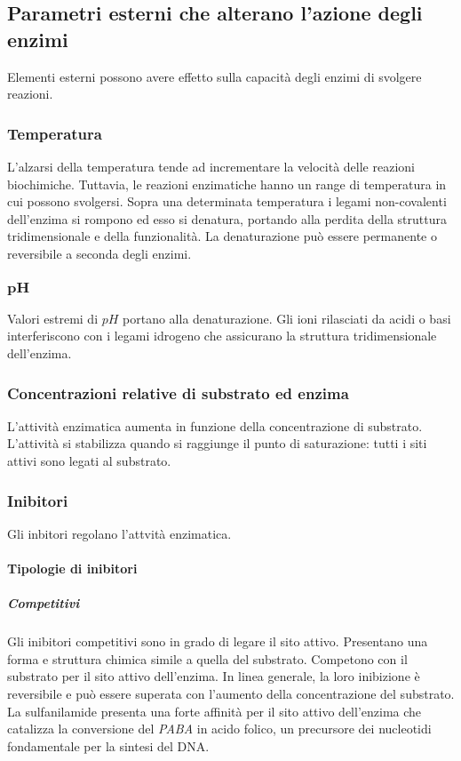 	\subsection{Parametri esterni che alterano l'azione degli enzimi}
	Elementi esterni possono avere effetto sulla capacit\`a degli enzimi di svolgere reazioni.

		\subsubsection{Temperatura}
		L'alzarsi della temperatura tende ad incrementare la velocit\`a delle reazioni biochimiche. 
		Tuttavia, le reazioni enzimatiche hanno un range di temperatura in cui possono svolgersi. 
		Sopra una determinata temperatura i legami non-covalenti dell'enzima si rompono ed esso si denatura, portando alla perdita della struttura tridimensionale e della funzionalit\`a. 
		La denaturazione pu\`o essere permanente o reversibile a seconda degli enzimi.

		\subsubsection{$\mathbf{pH}$}
		Valori estremi di $pH$ portano alla denaturazione.
		Gli ioni rilasciati da acidi o basi interferiscono con i legami idrogeno che assicurano la struttura tridimensionale dell'enzima.
	
		\subsubsection{Concentrazioni relative di substrato ed enzima}
		L'attivit\`a enzimatica aumenta in funzione della concentrazione di substrato.
		L'attivit\`a si stabilizza quando si raggiunge il punto di saturazione: tutti i siti attivi sono legati al substrato.

		\subsubsection{Inibitori}
		Gli inbitori regolano l'attvit\`a enzimatica. 
		
			\paragraph{Tipologie di inibitori}

				\subparagraph{Competitivi}
				Gli inibitori competitivi sono in grado di legare il sito attivo.
				Presentano una forma e struttura chimica simile a quella del substrato. 
				Competono con il substrato per il sito attivo dell'enzima. 
				In linea generale, la loro inibizione \`e reversibile e pu\`o essere superata con l'aumento della concentrazione del substrato. 
				La sulfanilamide presenta una forte affinit\`a per il sito attivo dell'enzima che catalizza la conversione del \emph{PABA} in acido folico, un precursore dei nucleotidi fondamentale per la sintesi del DNA.

